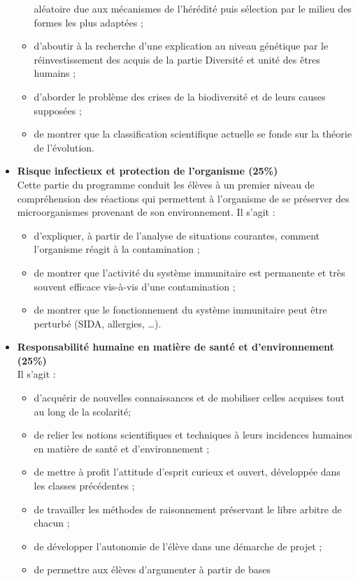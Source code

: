 \begin{itemize}
\begin{itemize}
aléatoire due aux mécanismes de l’hérédité puis sélection par le
milieu des formes les plus adaptées ;
		\item d’aboutir à la recherche d'une explication au niveau génétique par
le réinvestissement des acquis de la partie Diversité et unité des êtres
humains ; 
		\item d’aborder le problème des crises de la biodiversité et de leurs
causes supposées ;
		\item de montrer que la classification scientifique actuelle se fonde sur la
théorie de l’évolution. 
	\end{itemize}
\item \textbf{Risque infectieux et protection de l'organisme (25\%)}\\
Cette partie du programme conduit les élèves à un premier niveau
de compréhension des réactions qui permettent à l'organisme de se
préserver des microorganismes provenant de son environnement.
Il s'agit :
	\begin{itemize}
	\item d'expliquer, à partir de l'analyse de situations courantes, comment
l'organisme réagit à la contamination ;
\item de montrer que l’activité du système immunitaire est permanente
et très souvent efficace vis-à-vis d’une contamination ;
\item de montrer que le fonctionnement du système immunitaire peut
être perturbé (SIDA, allergies, …). 
	\end{itemize}
\item \textbf{Responsabilité humaine en matière de santé et d’environnement (25\%)} \\
Il s’agit :
\begin{itemize}
	\item d’acquérir de nouvelles connaissances et de mobiliser celles
acquises tout au long de la scolarité;
	\item de relier les notions scientifiques et techniques à leurs incidences
humaines en matière de santé et d’environnement ;
	\item de mettre à profit l’attitude d’esprit curieux et ouvert, développée
dans les classes précédentes ;
	\item de travailler les méthodes de raisonnement préservant le libre
arbitre de chacun ;
	\item de développer l’autonomie de l’élève dans une démarche de
projet ;
	\item de permettre aux élèves d’argumenter à partir de bases

\end{itemize}
\end{itemize}
